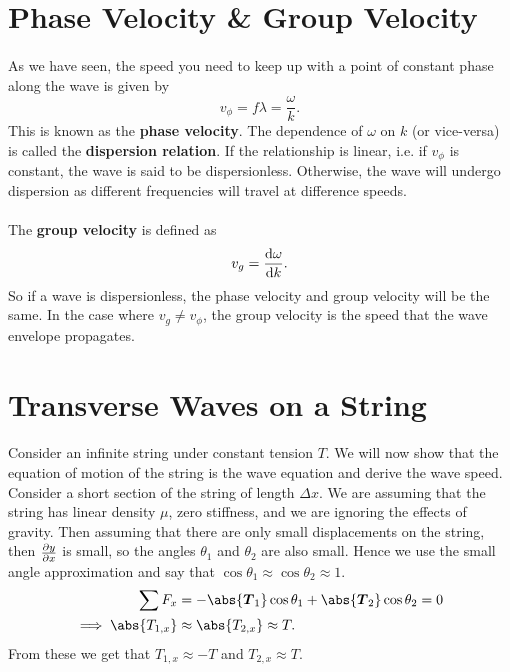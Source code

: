 \documentclass[../classical_mechanics.tex]{subfiles}
\begin{document}
    \section{Phase Velocity \& Group Velocity}
        \paragraph{}
        As we have seen, the speed you need to keep up with a point of constant phase along the wave is given by
        \begin{equation}
            v_\phi=f\lambda=\frac{\omega}{k}.
        \end{equation}
        This is known as the \textbf{phase velocity}.
        The dependence of $\omega$ on $k$ (or vice-versa) is called the \textbf{dispersion relation}.
        If the relationship is linear, i.e. if $v_\phi$ is constant, the wave is said to be dispersionless.
        Otherwise, the wave will undergo dispersion as different frequencies will travel at difference speeds.

        \paragraph{}
        The \textbf{group velocity} is defined as
        \begin{equation}
            v_g=\dv{\omega}{k}.
        \end{equation}
        So if a wave is dispersionless, the phase velocity and group velocity will be the same.
        In the case where $v_g\neq v_\phi$, the group velocity is the speed that the wave envelope propagates.

    \section{Transverse Waves on a String}
        \paragraph{}
        Consider an infinite string under constant tension $T$.
        We will now show that the equation of motion of the string is the wave equation and derive the wave speed.
        Consider a short section of the string of length $\Delta x$.
        We are assuming that the string has linear density $\mu$, zero stiffness, and we are ignoring the effects of gravity.
        Then assuming that there are only small displacements on the string, then $\pdv{y}{x}$ is small, so the angles $\theta_1$ and $\theta_2$ are also small.
        Hence we use the small angle approximation and say that $\cos\theta_1\approx\cos\theta_2\approx 1$.
        \begin{align}
            \sum F_x&=-\abs{\vec{T}_1}\cos\theta_1+\abs{\vec{T}_2}\cos\theta_2=0\\
            \implies\abs{T_{1,x}}&\approx\abs{T_{2,x}}\approx T.
        \end{align}
        From these we get that $T_{1,x}\approx -T$ and $T_{2,x}\approx T$.
        
\end{document}
